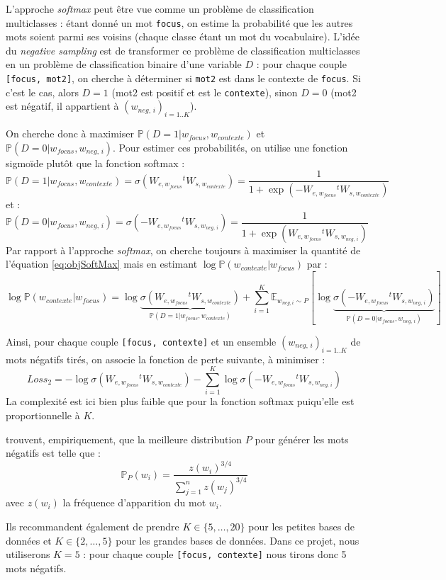 \documentclass[11pt,french,french]{article}
\begin{document}
L'approche \emph{softmax} peut être vue comme un problème de classification multiclasses : étant donné un mot \texttt{focus}, on estime la probabilité que les autres mots soient parmi ses voisins (chaque classe étant un mot du vocabulaire).
L'idée du \emph{negative sampling} est de transformer ce problème de classification multiclasses en un problème de classification binaire d'une variable \(D\) : pour chaque couple \texttt{{[}focus,\ mot2{]}}, on cherche à déterminer si \texttt{mot2} est dans le contexte de \texttt{focus}. Si c'est le cas, alors \(D=1\) (mot2 est positif et est le \texttt{contexte}), sinon \(D=0\) (mot2 est négatif, il appartient à \((w_{neg,\,i})_{i=1..K}\)).

On cherche donc à maximiser \(\mathbb P(D=1\vert w_{focus},w_{contexte})\) et \(\mathbb P(D=0\vert w_{focus},w_{neg,\,i})\).
Pour estimer ces probabilités, on utilise une fonction sigmoïde plutôt que la fonction softmax :
\[
\mathbb P(D=1\vert w_{focus},w_{contexte})=\sigma(W_{e,w_{focus}}{}^tW_{s,w_{contexte}}) = 
\frac{1}{1+\exp(-W_{e,w_{focus}}{}^tW_{s,w_{contexte}})}
\]
et :
\[
\mathbb P(D=0\vert w_{focus},w_{neg,\,i})=\sigma(-W_{e,w_{focus}}{}^tW_{s,w_{neg,\,i}}) = 
\frac{1}{1+\exp(W_{e,w_{focus}}{}^tW_{s,w_{neg,\,i}})}
\]
Par rapport à l'approche \emph{softmax}, on cherche toujours à maximiser la quantité de l'équation \eqref{eq:objSoftMax} mais en estimant \(\log\mathbb P(w_{contexte}\vert w_{focus})\) par :
\[
\log\mathbb P(w_{contexte}\vert w_{focus}) =
\log\underbrace{\sigma (W_{e,w_{focus}}{}^tW_{s,w_{contexte}})}_{
\mathbb P(D=1\vert w_{focus},w_{contexte})
}+
\sum_{i=1}^K\mathbb E_{w_{neg,i}\sim P}[
\log
\underbrace{\sigma (-W_{e,w_{focus}}{}^tW_{s,w_{neg,\,i}})}_{
\mathbb P(D=0\vert w_{focus},w_{neg,\,i})
}
]
\]

Ainsi, pour chaque couple \texttt{{[}focus,\ contexte{]}} et un ensemble \((w_{neg,\,i})_{i=1..K}\) de mots négatifs tirés, on associe la fonction de perte suivante, à minimiser :
\[
Loss_{2}=-\log\sigma (W_{e,w_{focus}}{}^tW_{s,w_{contexte}})
-
\sum_{i=1}^K
\log
\sigma (-W_{e,w_{focus}}{}^tW_{s,w_{neg,\,i}})
\]
La complexité est ici bien plus faible que pour la fonction softmax puiqu'elle est proportionnelle à \(K\).

\cite{MikolovNS} trouvent, empiriquement, que la meilleure distribution \(P\) pour générer les mots négatifs est telle que :
\[
\mathbb P_P(w_i) = \frac{z(w_i)^{3/4}}{
\sum_{j=1}^n z(w_j)^{3/4}
}
\]
avec \(z(w_i)\) la fréquence d'apparition du mot \(w_i\).

Ils recommandent également de prendre \(K\in\{5,\dots,20\}\) pour les petites bases de données et \(K\in\{2,\dots,5\}\) pour les grandes bases de données. Dans ce projet, nous utiliserons \(K=5\) : pour chaque couple \texttt{{[}focus,\ contexte{]}} nous tirons donc 5 mots négatifs.
\end{document}
